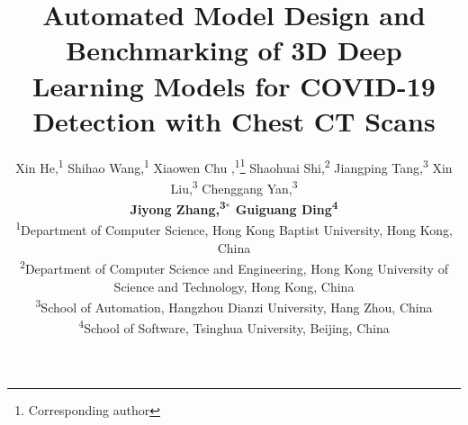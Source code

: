\documentclass[letterpaper]{article}
\begin{document}
 
%


\title{Automated Model Design and Benchmarking of 3D Deep Learning Models for COVID-19 Detection with Chest CT Scans}


\author{Xin He,\textsuperscript{1}
Shihao Wang,\textsuperscript{1}
Xiaowen Chu ,\textsuperscript{1}\thanks{Corresponding author}
Shaohuai Shi,\textsuperscript{2}
Jiangping Tang,\textsuperscript{3}
Xin Liu,\textsuperscript{3}
Chenggang Yan,\textsuperscript{3}\\
{\bf \Large Jiyong Zhang,\textsuperscript{3}$^*$
Guiguang Ding\textsuperscript{4}}\\
\textsuperscript{1}{Department of Computer Science, Hong Kong Baptist University, Hong Kong, China}\\
\textsuperscript{2}{Department of Computer Science and Engineering, Hong Kong University of Science and Technology, Hong Kong, China}\\
\textsuperscript{3}{School of Automation, Hangzhou Dianzi University, Hang Zhou, China}\\
\textsuperscript{4}{School of Software, Tsinghua University, Beijing, China}\\
}
\end{document}

